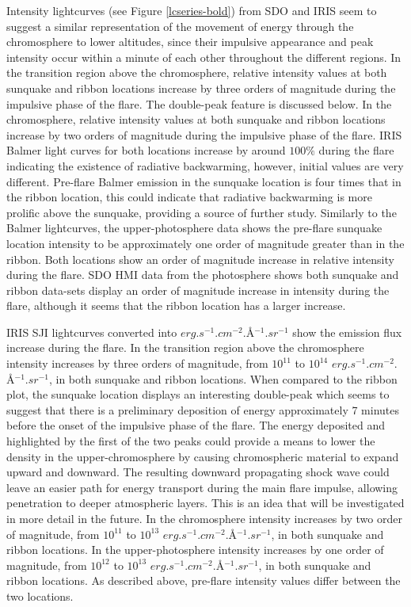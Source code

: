 Intensity lightcurves (see Figure \ref{lcseries-bold}) from SDO and IRIS seem to suggest a similar representation of the movement of energy through the chromosphere to lower altitudes, since their impulsive appearance and peak intensity occur within a minute of each other throughout the different regions. In the transition region above the chromosphere, relative intensity values at both sunquake and ribbon locations increase by three orders of magnitude during the impulsive phase of the flare. The double-peak feature is discussed below. In the chromosphere, relative intensity values at both sunquake and ribbon locations increase by two orders of magnitude during the impulsive phase of the flare. IRIS Balmer light curves for both locations increase by around $100\%$ during the flare indicating the existence of radiative backwarming, however, initial values are very different. Pre-flare Balmer emission in the sunquake location is four times that in the ribbon location, this could indicate that radiative backwarming is more prolific above the sunquake, providing a source of further study. Similarly to the Balmer lightcurves, the upper-photosphere data shows the pre-flare sunquake location intensity to be approximately one order of magnitude greater than in the ribbon. Both locations show an order of magnitude increase in relative intensity during the flare. SDO HMI data from the photosphere shows both sunquake and ribbon data-sets display an order of magnitude increase in intensity during the flare, although it seems that the ribbon location has a larger increase.




IRIS SJI lightcurves converted into $erg.s^{-1}.cm^{-2}.$\AA$^{-1}.sr^{-1}$ show the emission flux increase during the flare. In the transition region above the chromosphere intensity increases by three orders of magnitude, from $10^{11}$ to $10^{14}$ $erg.s^{-1}.cm^{-2}.$\AA$^{-1}.sr^{-1}$, in both sunquake and ribbon locations. When compared to the ribbon plot, the sunquake location displays an interesting double-peak which seems to suggest that there is a preliminary deposition of energy approximately 7 minutes before the onset of the impulsive phase of the flare. The energy deposited and highlighted by the first of the two peaks could provide a means to lower the density in the upper-chromosphere by causing chromospheric material to expand upward and downward. The resulting downward propagating shock wave could leave an easier path for energy transport during the main flare impulse, allowing penetration to deeper atmospheric layers. This is an idea that will be investigated in more detail in the future. In the chromosphere intensity increases by two order of magnitude, from $10^{11}$ to $10^{13}$ $erg.s^{-1}.cm^{-2}.$\AA$^{-1}.sr^{-1}$, in both sunquake and ribbon locations. In the upper-photosphere intensity increases by one order of magnitude, from $10^{12}$ to $10^{13}$ $erg.s^{-1}.cm^{-2}.$\AA$^{-1}.sr^{-1}$, in both sunquake and ribbon locations. As described above, pre-flare intensity values differ between the two locations.

